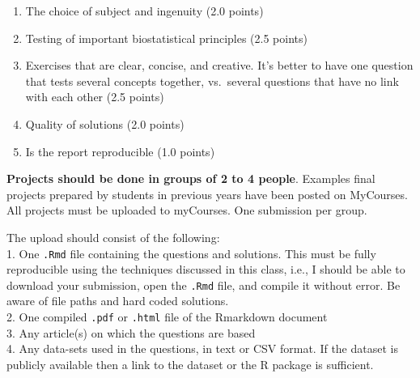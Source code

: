 \documentclass[letterpaper,12pt,twoside,]{pinp}
\providecommand{\tightlist}{%
  \setlength{\itemsep}{0pt}\setlength{\parskip}{0pt}}
\begin{document}
\begin{enumerate}
\def\labelenumi{\arabic{enumi}.}
\tightlist
\item
  The choice of subject and ingenuity (2.0 points)\\
\item
  Testing of important biostatistical principles (2.5 points)\\
\item
  Exercises that are clear, concise, and creative. It's better to have
  one question that tests several concepts together, vs.~several
  questions that have no link with each other (2.5 points)\\
\item
  Quality of solutions (2.0 points)\\
\item
  Is the report reproducible (1.0 points)
\end{enumerate}

\vspace*{.1in}

\textbf{Projects should be done in groups of 2 to 4 people}. Examples
final projects prepared by students in previous years have been posted
on MyCourses. All projects must be uploaded to myCourses. One submission
per group.

The upload should consist of the following:\\
1. One \texttt{.Rmd} file containing the questions and solutions. This
must be fully reproducible using the techniques discussed in this class,
i.e., I should be able to download your submission, open the
\texttt{.Rmd} file, and compile it without error. Be aware of file paths
and hard coded solutions.\\
2. One compiled \texttt{.pdf} or \texttt{.html} file of the Rmarkdown
document\\
3. Any article(s) on which the questions are based\\
4. Any data-sets used in the questions, in text or CSV format. If the
dataset is publicly available then a link to the dataset or the R
package is sufficient.





\end{document}
